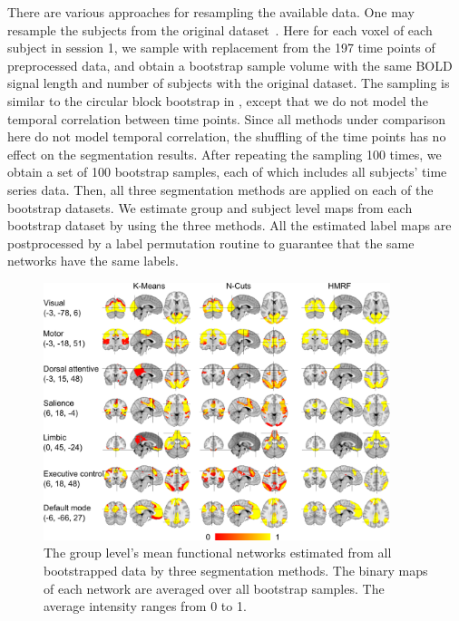 \documentclass[review,authoryear]{elsarticle}
\begin{document}
There are various approaches for resampling the available data. One may resample
the subjects from the original dataset~\citep{damoiseaux2006consistent}. Here
for each voxel of each subject in session 1, we sample with replacement from the
197 time points of preprocessed data, and obtain a bootstrap sample volume with
the same BOLD signal length and number of subjects with the original
dataset. The sampling is similar to the circular block bootstrap  in
\cite{bellec2010multi}, except that we do not model the temporal correlation
between time points. Since all methods under comparison here do not model
temporal correlation, the shuffling of the time points has no effect on the
segmentation results.  After repeating the sampling 100 times, we obtain a set
of 100 bootstrap samples, each of which includes all subjects' time series
data. Then, all three segmentation methods are applied on each of the bootstrap
datasets. We estimate group and subject level maps from each bootstrap dataset
by using the three methods. All the estimated label maps are postprocessed by a
label permutation routine to guarantee that the same networks have the same
labels.

\begin{figure}[htb]
  \centering
  \includegraphics[width=0.9\textwidth]{figures/groupmean/grp_mean}
  \caption{The group level's mean functional networks estimated from all
    bootstrapped data by three segmentation methods. The binary maps of each
    network are averaged over all bootstrap samples. The average intensity ranges
    from 0 to 1.}
  \label{fig:grpmean}
\end{figure}
\end{document}
